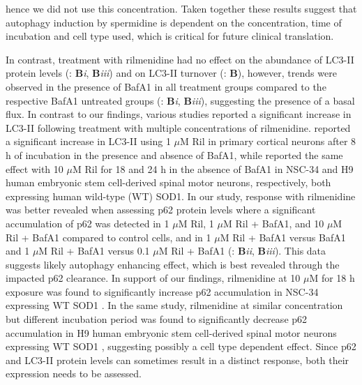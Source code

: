 {hence we did not use this concentration. Taken together these results suggest that autophagy induction by spermidine is dependent on the concentration, time of incubation and cell type used, which is critical for future clinical translation.

In contrast, treatment with rilmenidine had no effect on the abundance of LC3-II protein levels (: \textbf{B}\textit{i}, \textbf{B}\textit{iii}) and on LC3-II turnover (: \textbf{B}), however, trends were observed in the presence of BafA1 in all treatment groups compared to the respective BafA1 untreated groups (: \textbf{B}\textit{i}, \textbf{B}\textit{iii}), suggesting the presence of a basal flux.  In contrast to our findings, various studies reported a significant increase in LC3-II following treatment with multiple concentrations of rilmenidine. \citet{Rose2010} reported a significant increase in LC3-II using 1 $\mu$M Ril in primary cortical neurons after 8 h of incubation in the presence and absence of BafA1, while \citet{Perera2018} reported the same effect with 10 $\mu$M Ril for 18 and 24 h  in the absence of BafA1 in NSC-34 and H9 human embryonic stem cell-derived spinal motor neurons, respectively, both expressing human wild-type (WT) SOD1. In our study, response with rilmenidine was better revealed when assessing p62 protein levels where a significant accumulation of p62 was detected in 1 $\mu$M Ril, 1 $\mu$M Ril + BafA1, and 10 $\mu$M Ril + BafA1 compared to control cells, and in 1 $\mu$M Ril + BafA1 versus BafA1 and 1 $\mu$M Ril + BafA1 versus 0.1 $\mu$M Ril + BafA1 (: \textbf{B}\textit{ii}, \textbf{B}\textit{iii}). This data suggests likely autophagy enhancing effect, which is best revealed through the impacted p62 clearance. In support of our findings, rilmenidine at 10 $\mu$M for 18 h exposure was found to significantly increase p62 accumulation in NSC-34 expressing WT SOD1 \citep{Perera2018}. In the same study, rilmenidine at similar concentration but different incubation period was found to significantly decrease p62 accumulation in H9 human embryonic stem cell-derived spinal motor neurons expressing WT SOD1  \citep{Perera2018}, suggesting possibly a cell type dependent effect. Since p62 and LC3-II protein levels can sometimes result in a distinct response, both their expression needs to be assessed.

}

